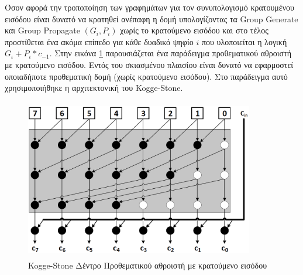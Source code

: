 Όσον αφορά την τροποποίηση των γραφημάτων για τον συνυπολογισμό κρατουμένου εισόδου
είναι δυνατό να κρατηθεί ανέπαφη η δομή υπολογίζοντας τα Group Generate και Group Propagate 
$(G_i,P_i)$ χωρίς το κρατούμενο εισόδου  και στο τέλος προστίθεται ένα ακόμα επίπεδο
για κάθε δυαδικό ψηφίο $i$ που υλοποιείται η λογική $G_ι + P_ι*c_{-1}$.
Στην εικόνα \ref{Kogge-StoneTree_with_carry_in} παρουσιάζεται ένα παράδειγμα προθεματικού αθροιστή
με κρατούμενο εισόδου. Εντός του σκιασμένου πλαισίου είναι δυνατό να εφαρμοστεί οποιαδήποτε 
προθεματική δομή (χωρίς κρατούμενο εισόδου). Στο παράδειγμα αυτό χρησιμοποιήθηκε η 
αρχιτεκτονική του Kogge-Stone.
\begin{figure}[H]
    \centering
    \includegraphics[height=7cm,width=10cm]{Pictures/Kogge-stone_with_carry_in.png}
    \caption{Kogge-Stone Δέντρο Προθεματικού αθροιστή με κρατούμενο εισόδου}
    \label{Kogge-StoneTree_with_carry_in}
\end{figure}

